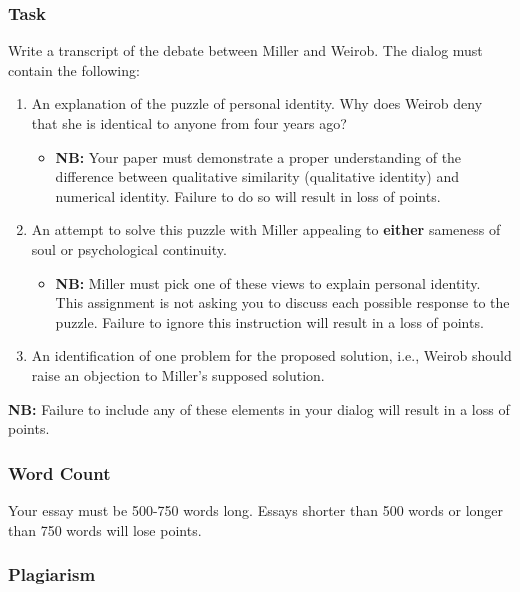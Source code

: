 \documentclass[]{article}
\providecommand{\tightlist}{%
  \setlength{\itemsep}{0pt}\setlength{\parskip}{0pt}}
\begin{document}
\subsubsection{Task}\label{task}

Write a transcript of the debate between Miller and Weirob. The dialog
must contain the following:

\begin{enumerate}
\def\labelenumi{\arabic{enumi}.}
\tightlist
\item
  An explanation of the puzzle of personal identity. Why does Weirob
  deny that she is identical to anyone from four years ago?

  \begin{itemize}
  \tightlist
  \item
    \textbf{NB:} Your paper must demonstrate a proper understanding of
    the difference between qualitative similarity (qualitative identity)
    and numerical identity. Failure to do so will result in loss of
    points.
  \end{itemize}
\item
  An attempt to solve this puzzle with Miller appealing to
  \textbf{either} sameness of soul or psychological continuity.

  \begin{itemize}
  \tightlist
  \item
    \textbf{NB:} Miller must pick one of these views to explain personal
    identity. This assignment is not asking you to discuss each possible
    response to the puzzle. Failure to ignore this instruction will
    result in a loss of points.\\
  \end{itemize}
\item
  An identification of one problem for the proposed solution, i.e.,
  Weirob should raise an objection to Miller's supposed solution.
\end{enumerate}

\textbf{NB:} Failure to include any of these elements in your dialog
will result in a loss of points.

\subsubsection{Word Count}\label{word-count}

Your essay must be 500-750 words long. Essays shorter than 500 words or
longer than 750 words will lose points.

\subsubsection{Plagiarism}\label{plagiarism}
\end{document}
